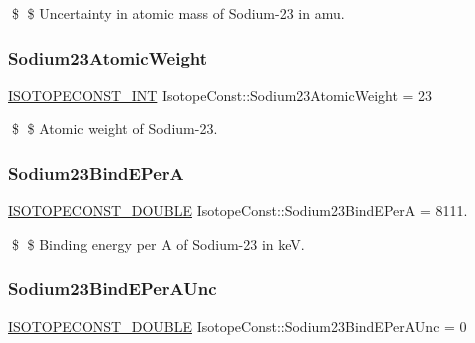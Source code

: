 \$ \$ Uncertainty in atomic mass of Sodium-\/23 in amu. \mbox{\label{group___isotope_const-_sodium-_na23_ga1aa5070e00944dccebe51082cced9529}} 
\subsubsection{\texorpdfstring{Sodium23\+Atomic\+Weight}{Sodium23AtomicWeight}}
{\footnotesize\ttfamily \mbox{\hyperlink{group___isotope_const-_macros_ga5f18360b3e99483a35c32d789e62621c}{I\+S\+O\+T\+O\+P\+E\+C\+O\+N\+S\+T\+\_\+\+I\+NT}} Isotope\+Const\+::\+Sodium23\+Atomic\+Weight = 23}

\$ \$ Atomic weight of Sodium-\/23. \mbox{\label{group___isotope_const-_sodium-_na23_gab19fd46f30eecd1fda6e5d4962ed6dd5}} 
\subsubsection{\texorpdfstring{Sodium23\+Bind\+E\+PerA}{Sodium23BindEPerA}}
{\footnotesize\ttfamily \mbox{\hyperlink{group___isotope_const-_macros_ga8f45a7272ce02c0b4c65c44636ed719a}{I\+S\+O\+T\+O\+P\+E\+C\+O\+N\+S\+T\+\_\+\+D\+O\+U\+B\+LE}} Isotope\+Const\+::\+Sodium23\+Bind\+E\+PerA = 8111.}

\$ \$ Binding energy per A of Sodium-\/23 in keV. \mbox{\label{group___isotope_const-_sodium-_na23_gaf458314b4029149f850901443fcc8ca2}} 
\subsubsection{\texorpdfstring{Sodium23\+Bind\+E\+Per\+A\+Unc}{Sodium23BindEPerAUnc}}
{\footnotesize\ttfamily \mbox{\hyperlink{group___isotope_const-_macros_ga8f45a7272ce02c0b4c65c44636ed719a}{I\+S\+O\+T\+O\+P\+E\+C\+O\+N\+S\+T\+\_\+\+D\+O\+U\+B\+LE}} Isotope\+Const\+::\+Sodium23\+Bind\+E\+Per\+A\+Unc = 0}

